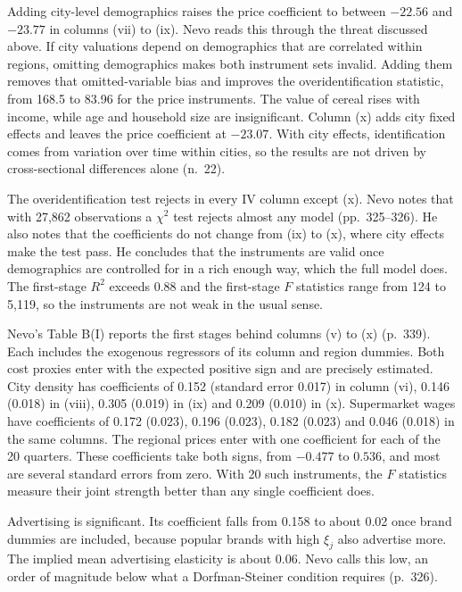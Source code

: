 Adding city-level demographics raises the price coefficient to between $-22.56$ and $-23.77$ in columns (vii)
to (ix). Nevo reads this through the threat discussed above. If city valuations depend on demographics that are
correlated within regions, omitting demographics makes both instrument sets invalid. Adding them removes that
omitted-variable bias and improves the overidentification statistic, from 168.5 to 83.96 for the price
instruments. The value of cereal rises with income, while age and household size are insignificant. Column (x)
adds city fixed effects and leaves the price coefficient at $-23.07$. With city effects, identification comes
from variation over time within cities, so the results are not driven by cross-sectional differences alone
(n.~22).

The overidentification test rejects in every IV column except (x). Nevo notes that with 27,862 observations a
$\chi^2$ test rejects almost any model (pp.~325--326). He also notes that the coefficients do not change
from (ix) to (x), where city effects make the test pass. He concludes that the instruments are valid once demographics are
controlled for in a rich enough way, which the full model does. The first-stage $R^2$ exceeds 0.88 and the
first-stage $F$ statistics range from 124 to 5,119, so the instruments are not weak in the usual sense.

Nevo's Table B(I) reports the first stages behind columns (v) to (x) (p.~339). Each includes the exogenous
regressors of its column and region dummies. Both cost proxies enter with the expected positive sign and are
precisely estimated. City density has coefficients of 0.152 (standard error 0.017) in column (vi), 0.146 (0.018)
in (viii), 0.305 (0.019) in (ix) and 0.209 (0.010) in (x). Supermarket wages have coefficients of 0.172 (0.023),
0.196 (0.023), 0.182 (0.023) and 0.046 (0.018) in the same columns. The regional prices enter with one coefficient
for each of the 20 quarters. These coefficients take both signs, from $-0.477$ to $0.536$, and most are several
standard errors from zero. With 20 such instruments, the $F$ statistics measure their joint strength better than
any single coefficient does.

Advertising is significant. Its coefficient falls from 0.158 to about 0.02 once brand dummies are included,
because popular brands with high $\xi_j$ also advertise more. The implied mean advertising elasticity is about
0.06. Nevo calls this low, an order of magnitude below what a Dorfman-Steiner condition requires (p.~326).

